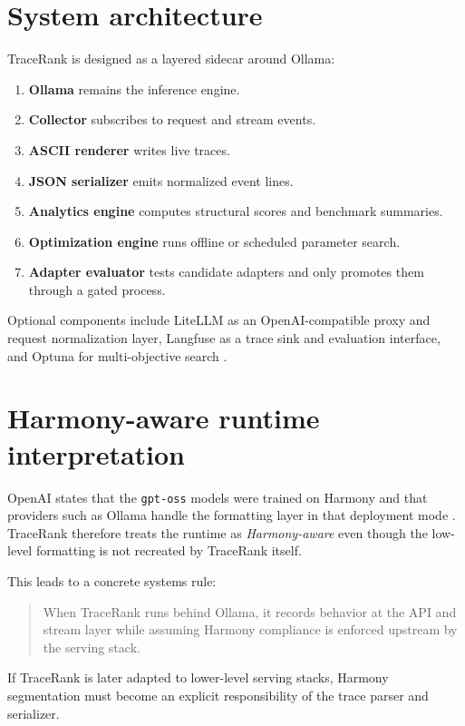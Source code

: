     \section{System architecture}
    TraceRank is designed as a layered sidecar around Ollama:
    \begin{enumerate}[label=\arabic*.]
      \item \textbf{Ollama} remains the inference engine.
      \item \textbf{Collector} subscribes to request and stream events.
      \item \textbf{ASCII renderer} writes live traces.
      \item \textbf{JSON serializer} emits normalized event lines.
      \item \textbf{Analytics engine} computes structural scores and benchmark summaries.
      \item \textbf{Optimization engine} runs offline or scheduled parameter search.
      \item \textbf{Adapter evaluator} tests candidate adapters and only promotes them through a gated process.
    \end{enumerate}
    
    Optional components include LiteLLM as an OpenAI-compatible proxy and request normalization layer, Langfuse as a trace sink and evaluation interface, and Optuna for multi-objective search \cite{litellm_ollama,langfuse_ollama,optuna_multi}.
    
    \section{Harmony-aware runtime interpretation}
    OpenAI states that the \texttt{gpt-oss} models were trained on Harmony and that providers such as Ollama handle the formatting layer in that deployment mode \cite{openai_harmony,openai_ollama_guide}. TraceRank therefore treats the runtime as \emph{Harmony-aware} even though the low-level formatting is not recreated by TraceRank itself.
    
    This leads to a concrete systems rule:
    \begin{quote}
    When TraceRank runs behind Ollama, it records behavior at the API and stream layer while assuming Harmony compliance is enforced upstream by the serving stack.
    \end{quote}
    
    If TraceRank is later adapted to lower-level serving stacks, Harmony segmentation must become an explicit responsibility of the trace parser and serializer.
    
